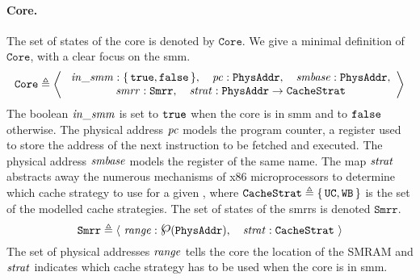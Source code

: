 \paragraph{Core.}
%
The set of states of the core is denoted by $\texttt{Core}$.
%
We give a minimal definition of $\texttt{Core}$, with a clear focus on the
\ac{smm}.
%
\[
  \texttt{Core} \triangleq \left<\
    \begin{array}{c}
      \mathit{in\_smm} : \{\,\mathtt{true},
      \mathtt{false}\,\},\quad\mathit{pc}: \texttt{PhysAddr},\quad\mathit{smbase} :
      \texttt{PhysAddr}, \\
      \mathit{smrr} : \texttt{Smrr},\quad\mathit{strat} :
      \texttt{PhysAddr} \rightarrow \texttt{CacheStrat}
    \end{array}
  \right>
\]
%
The boolean $\mathit{in\_smm}$ is set to $\mathtt{true}$ when the core is in \ac{smm}
and to $\mathtt{false}$ otherwise.
%
The physical address $\mathit{pc}$ models the program counter, a register used to
store the address of the next instruction to be fetched and executed.
%
The physical address $\mathit{smbase}$ models the register of the same name.
%
The map $\mathit{strat}$ abstracts away the numerous mechanisms of x86
microprocessors to determine which cache strategy to use for a given \IO, where
$\texttt{CacheStrat} \triangleq \{\,\mathtt{UC}, \mathtt{WB}\,\}$ is the set of
the modelled cache strategies.
%
The set of states of the \acp{smrr} is denoted $\texttt{Smrr}$.
%
%
\[
  \texttt{Smrr} \triangleq \langle~\func{range}:
  \powerset(\texttt{PhysAddr}),\quad\func{strat}: \texttt{CacheStrat}~\rangle
\]
%
The set of physical addresses $\mathit{range}$ tells the core the location of the
SMRAM and $\mathit{strat}$ indicates which cache strategy has to be used when the core
is in \ac{smm}.


